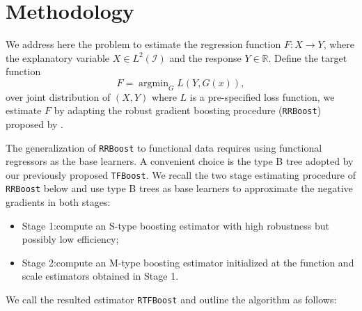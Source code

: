 \documentclass{article}
\DeclareMathOperator*{\argmin}{argmin}
\begin{document}
\section{Methodology}
We address here the problem to estimate the regression function $F: X \rightarrow Y$, where the explanatory variable $X \in L^2(\mathcal{I})$ and the response $Y \in \mathbb{R}$. Define the target function 
$$F = \argmin_{G}L(Y, G(x)),$$
over joint distribution of $(X,Y)$ where $L$ is a pre-specified loss function, we estimate $F$ by adapting the robust gradient boosting procedure (\texttt{RRBoost}) proposed  by \cite{ju2021robust}. 

The generalization of \texttt{RRBoost} to functional data requires using functional regressors as the base learners. A convenient choice is the type B tree adopted by our previously proposed \texttt{TFBoost}. We recall the two stage estimating procedure of \texttt{RRBoost} below and use type B trees as base learners to approximate the negative gradients in both stages:
\begin{itemize}
\item Stage 1:compute an S-type boosting estimator with high robustness but possibly low efficiency;
\item Stage 2:compute an M-type boosting estimator initialized at the function and scale estimators obtained in Stage 1.	
\end{itemize}
We call the resulted estimator \texttt{RTFBoost} and outline the algorithm as follows: 
\end{document}
